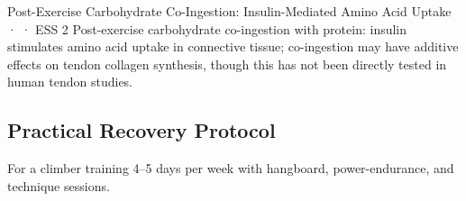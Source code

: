 \begin{bioplausbox}{Post-Exercise Carbohydrate Co-Ingestion: Insulin-Mediated Amino Acid Uptake · \bioplausible · ESS 2}
Post-exercise carbohydrate co-ingestion with protein: insulin stimulates amino acid uptake in connective tissue; co-ingestion may have additive effects on tendon collagen synthesis, though this has not been directly tested in human tendon studies.
\end{bioplausbox}

\subsection{Practical Recovery Protocol}

For a climber training 4--5 days per week with hangboard, power-endurance, and technique sessions.

